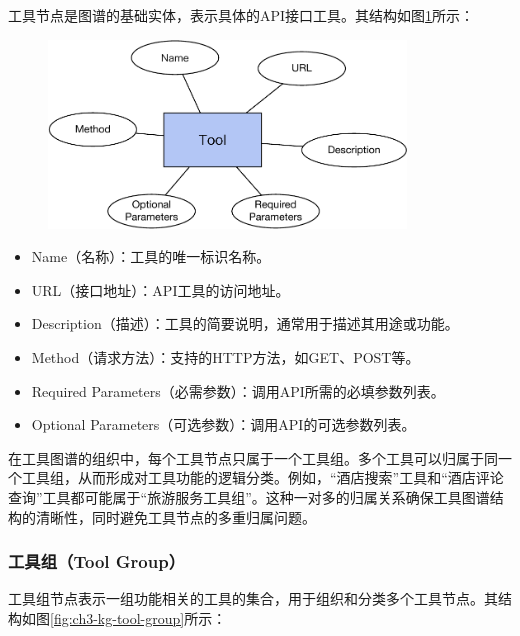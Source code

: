 工具节点是图谱的基础实体，表示具体的API接口工具。其结构如图\ref{fig:ch3-kg-tool}所示：

\begin{figure}[H]
    \vspace{1em}
    \centering
    \setlength{\abovecaptionskip}{10pt} %
    \includegraphics[height=5cm]{../assets/图谱格式-tool.pdf}
    \label{fig:ch3-kg-tool}
\end{figure}

\begin{itemize}
    \item Name（名称）：工具的唯一标识名称。
    \item URL（接口地址）：API工具的访问地址。
    \item Description（描述）：工具的简要说明，通常用于描述其用途或功能。
    \item Method（请求方法）：支持的HTTP方法，如GET、POST等。
    \item Required Parameters（必需参数）：调用API所需的必填参数列表。
    \item Optional Parameters（可选参数）：调用API的可选参数列表。
\end{itemize}

在工具图谱的组织中，每个工具节点只属于一个工具组。多个工具可以归属于同一个工具组，从而形成对工具功能的逻辑分类。例如，“酒店搜索”工具和“酒店评论查询”工具都可能属于“旅游服务工具组”。这种一对多的归属关系确保工具图谱结构的清晰性，同时避免工具节点的多重归属问题。

\subsubsection{工具组（Tool Group）}

工具组节点表示一组功能相关的工具的集合，用于组织和分类多个工具节点。其结构如图\ref{fig:ch3-kg-tool-group}所示：

